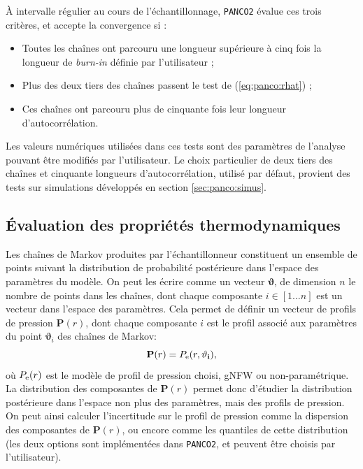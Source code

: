 À intervalle régulier au cours de l'échantillonnage, \texttt{PANCO2} évalue ces trois critères, et accepte la convergence si :
\begin{itemize}[leftmargin=*]
    \setlength\itemsep{5pt}
    \item Toutes les chaînes ont parcouru une longueur supérieure à cinq fois la longueur de \textit{burn-in} définie par l'utilisateur ;
    \item Plus des deux tiers des chaînes passent le test de \citeauthor{gelman_inference_1992} (\ref{eq:panco:rhat}) ;
    \item Ces chaînes ont parcouru plus de cinquante fois leur longueur d'autocorrélation.
\end{itemize}
Les valeurs numériques utilisées dans ces tests sont des paramètres de l'analyse pouvant être modifiés par l'utilisateur.
Le choix particulier de deux tiers des chaînes et cinquante longueurs d'autocorrélation, utilisé par défaut, provient des tests sur simulations développés en section \ref{sec:panco:simus}.

\subsection{Évaluation des propriétés thermodynamiques} \label{sec:panco:thermo}

Les chaînes de Markov produites par l'échantillonneur constituent un ensemble de points suivant la distribution de probabilité postérieure dans l'espace des paramètres du modèle.
On peut les écrire comme un vecteur $\mathbf{\vartheta}$, de dimension $n$ le nombre de points dans les chaînes, dont chaque composante $i \in [1 \dots n]$ est un vecteur dans l'espace des paramètres.
Cela permet de définir un vecteur de profils de pression $\mathbf{P}(r)$, dont chaque composante $i$ est le profil associé aux paramètres du point $\mathbf{\vartheta}_i$ des chaînes de Markov:
\begin{equation}
    \label{eq:panco:press_vec}
    \mathbf{P}(r) = P_{\rm e}(r, \mathbf{\vartheta_i}),
\end{equation}
où $P_{\rm e}(r)$ est le modèle de profil de pression choisi, gNFW ou non-paramétrique. \\
La distribution des composantes de $\mathbf{P}(r)$ permet donc d'étudier la distribution postérieure dans l'espace non plus des paramètres, mais des profils de pression.
On peut ainsi calculer l'incertitude sur le profil de pression comme la dispersion des composantes de $\mathbf{P}(r)$, ou encore comme les quantiles de cette distribution (les deux options sont implémentées dans \texttt{PANCO2}, et peuvent être choisis par l'utilisateur).

